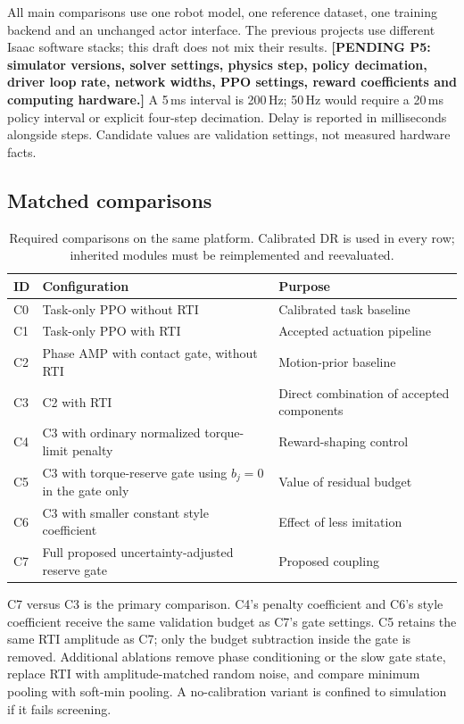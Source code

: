 \documentclass[11pt,a4paper]{article}
\newcommand{\pending}[1]{\textbf{[PENDING #1]}}
\begin{document}
All main comparisons use one robot model, one reference dataset, one training backend and an unchanged actor interface. The previous projects use different Isaac software stacks; this draft does not mix their results. \pending{P5: simulator versions, solver settings, physics step, policy decimation, driver loop rate, network widths, PPO settings, reward coefficients and computing hardware.} A 5\,ms interval is 200\,Hz; 50\,Hz would require a 20\,ms policy interval or explicit four-step decimation. Delay is reported in milliseconds alongside steps. Candidate values are validation settings, not measured hardware facts.

\subsection{Matched comparisons}
\begin{table}[ht]
\centering\small
\caption{Required comparisons on the same platform. Calibrated DR is used in every row; inherited modules must be reimplemented and reevaluated.}
\begin{tabular}{p{9mm}p{88mm}p{37mm}}
\toprule ID & Configuration & Purpose\\\midrule
C0 & Task-only PPO without RTI & Calibrated task baseline\\
C1 & Task-only PPO with RTI & Accepted actuation pipeline\\
C2 & Phase AMP with contact gate, without RTI & Motion-prior baseline\\
C3 & C2 with RTI & Direct combination of accepted components\\
C4 & C3 with ordinary normalized torque-limit penalty & Reward-shaping control\\
C5 & C3 with torque-reserve gate using $b_j=0$ in the gate only & Value of residual budget\\
C6 & C3 with smaller constant style coefficient & Effect of less imitation\\
C7 & Full proposed uncertainty-adjusted reserve gate & Proposed coupling\\\bottomrule
\end{tabular}
\end{table}
C7 versus C3 is the primary comparison. C4's penalty coefficient and C6's style coefficient receive the same validation budget as C7's gate settings. C5 retains the same RTI amplitude as C7; only the budget subtraction inside the gate is removed. Additional ablations remove phase conditioning or the slow gate state, replace RTI with amplitude-matched random noise, and compare minimum pooling with soft-min pooling. A no-calibration variant is confined to simulation if it fails screening.
\end{document}
